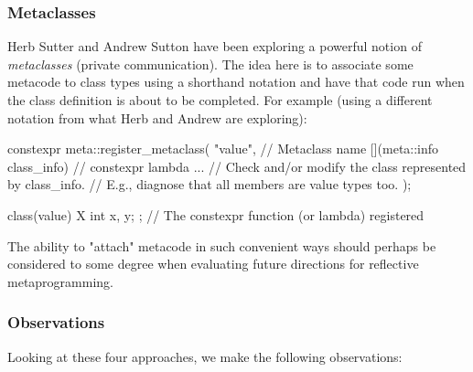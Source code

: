 \documentclass{wg21}
\begin{document}
\subsubsection{Metaclasses}
Herb Sutter and Andrew Sutton have been exploring a powerful notion of
\textit{metaclasses} (private communication). The idea here is to associate
some metacode to class types using a shorthand notation and have that code run
when the class definition is about to be completed. For example (using a
different notation from what Herb and Andrew are exploring):

\begin{cpp}
constexpr {
  meta::register_metaclass(
    "value",  // Metaclass name
    [](meta::info class_info) {  // constexpr lambda
      ...  // Check and/or modify the class represented by class_info.
           // E.g., diagnose that all members are value types too.
    });
}

class(value) X {
  int x, y;
};  // The constexpr function (or lambda) registered
\end{cpp}

The ability to "attach" metacode in such convenient ways should perhaps be
considered to some degree when evaluating future directions for reflective
metaprogramming.


\subsubsection{Observations}
Looking at these four approaches, we make the following observations:
\end{document}
